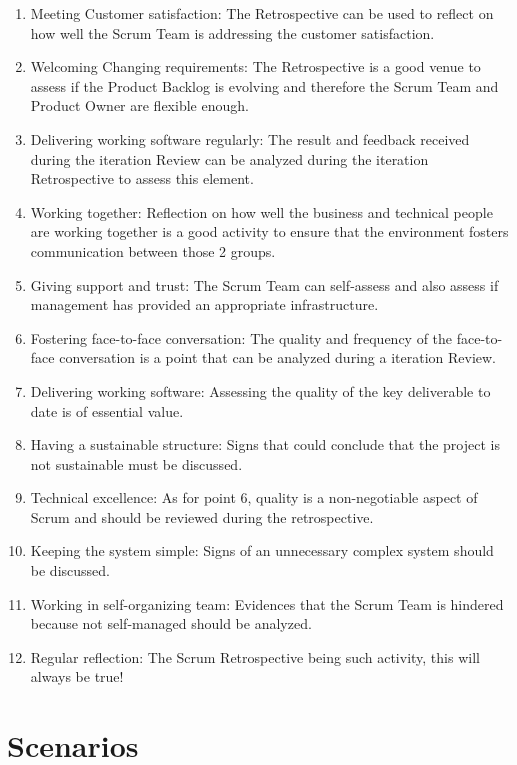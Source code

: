 \begin{enumerate}
\item Meeting Customer satisfaction: The Retrospective can be used to reflect on how well the Scrum Team is addressing the customer satisfaction.
\item Welcoming Changing requirements: The Retrospective is a good venue to assess if the Product Backlog is evolving and therefore the Scrum Team and Product Owner are flexible enough.
\item Delivering working software regularly: The result and feedback received during the iteration Review can be analyzed during the iteration Retrospective to assess this element.
\item Working together: Reflection on how well the business and technical people are working together is a good activity to ensure that the environment fosters communication between those 2 groups.
\item Giving support and trust: The Scrum Team can self-assess and also assess if management has provided an appropriate infrastructure.
\item Fostering face-to-face conversation: The quality and frequency of the face-to-face conversation is a point that can be analyzed during a iteration Review.
\item Delivering working software: Assessing the quality of the key deliverable to date is of essential value.
\item Having a sustainable structure: Signs that could conclude that the project is not sustainable must be discussed.
\item Technical excellence: As for point 6, quality is a non-negotiable aspect of Scrum and should be reviewed during the retrospective.
\item Keeping the system simple: Signs of an unnecessary complex system should be discussed.
\item Working in self-organizing team: Evidences that the Scrum Team is hindered because not self-managed should be analyzed.
\item Regular reflection: The Scrum Retrospective being such activity, this will always be true!
\end{enumerate}

\section{Scenarios}
\label{problemdefinition}

